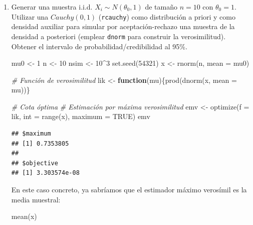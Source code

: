 \documentclass[
]{book}
\newenvironment{Shaded}{\begin{snugshade}}{\end{snugshade}}
\newcommand{\AttributeTok}[1]{\textcolor[rgb]{0.77,0.63,0.00}{#1}}
\newcommand{\CommentTok}[1]{\textcolor[rgb]{0.56,0.35,0.01}{\textit{#1}}}
\newcommand{\ConstantTok}[1]{\textcolor[rgb]{0.00,0.00,0.00}{#1}}
\newcommand{\ControlFlowTok}[1]{\textcolor[rgb]{0.13,0.29,0.53}{\textbf{#1}}}
\newcommand{\DecValTok}[1]{\textcolor[rgb]{0.00,0.00,0.81}{#1}}
\newcommand{\FunctionTok}[1]{\textcolor[rgb]{0.00,0.00,0.00}{#1}}
\newcommand{\NormalTok}[1]{#1}
\newcommand{\OtherTok}[1]{\textcolor[rgb]{0.56,0.35,0.01}{#1}}
\newcommand{\SpecialCharTok}[1]{\textcolor[rgb]{0.00,0.00,0.00}{#1}}
\theoremstyle{break}
\theoremstyle{definition}
\theoremstyle{definition}
\theoremstyle{definition}
\theoremstyle{definition}
\theoremstyle{remark}
\begin{document}
\begin{enumerate}
\def\labelenumi{\alph{enumi})}
\item
  Generar una muestra i.i.d. \(X_{i}\sim N(\theta_{0},1)\) de tamaño
  \(n=10\) con \(\theta_{0}=1\). Utilizar una \(Cauchy(0,1)\)
  (\texttt{rcauchy}) como distribución a priori y como densidad auxiliar
  para simular por aceptación-rechazo una muestra de la densidad a
  posteriori (emplear \texttt{dnorm} para construir la verosimilitud).
  Obtener el intervalo de probabilidad/credibilidad al 95\%.

\begin{Shaded}
\begin{Highlighting}[]
\NormalTok{mu0 }\OtherTok{\textless{}{-}} \DecValTok{1}
\NormalTok{n }\OtherTok{\textless{}{-}} \DecValTok{10}
\NormalTok{nsim }\OtherTok{\textless{}{-}} \DecValTok{10}\SpecialCharTok{\^{}}\DecValTok{3}
\FunctionTok{set.seed}\NormalTok{(}\DecValTok{54321}\NormalTok{)}
\NormalTok{x }\OtherTok{\textless{}{-}} \FunctionTok{rnorm}\NormalTok{(n, }\AttributeTok{mean =}\NormalTok{ mu0)}

\CommentTok{\# Función de verosimilitud}
\NormalTok{lik }\OtherTok{\textless{}{-}} \ControlFlowTok{function}\NormalTok{(mu)\{}\FunctionTok{prod}\NormalTok{(}\FunctionTok{dnorm}\NormalTok{(x, }\AttributeTok{mean =}\NormalTok{ mu))\}}

\CommentTok{\# Cota óptima}
\CommentTok{\# Estimación por máxima verosimilitud}
\NormalTok{emv }\OtherTok{\textless{}{-}} \FunctionTok{optimize}\NormalTok{(}\AttributeTok{f =}\NormalTok{ lik, }\AttributeTok{int =} \FunctionTok{range}\NormalTok{(x), }\AttributeTok{maximum =} \ConstantTok{TRUE}\NormalTok{)}
\NormalTok{emv}
\end{Highlighting}
\end{Shaded}

\begin{verbatim}
## $maximum
## [1] 0.7353805
## 
## $objective
## [1] 3.303574e-08
\end{verbatim}

\begin{Shaded}
\end{Shaded}

  En este caso concreto, ya sabríamos que el estimador máximo verosímil es la media muestral:

\begin{Shaded}
\begin{Highlighting}[]
\FunctionTok{mean}\NormalTok{(x)}
\end{Highlighting}
\end{Shaded}


\end{enumerate}
\end{document}
